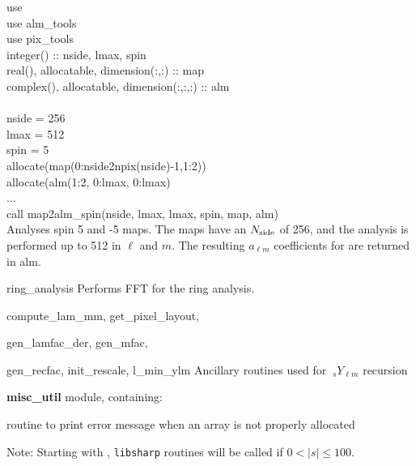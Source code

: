 \begin{example}
{
use \\
use alm\_tools\\
use pix\_tools\\
integer() :: nside, lmax, spin \\
real(), allocatable, dimension(:,:) :: map \\
complex(), allocatable, dimension(:,:,:) :: alm \\
\\
nside = 256 \\
lmax = 512 \\
spin = 5 \\
allocate(map(0:nside2npix(nside)-1,1:2)) \\
allocate(alm(1:2, 0:lmax, 0:lmax)\\
...\\
call map2alm\_spin(nside, lmax, lmax, spin, map, alm)  \\
}
{
Analyses spin 5 and -5 maps. The maps have
an $N_{\mathrm{side}}$ of 256, and the analysis is performed up
to 512 in $\ell$ and $m$. The resulting $a_{\ell m}$ coefficients for
are returned in alm.
}
\end{example}

\begin{modules}
  \begin{sulist}{} %
  \item[ring\_analysis] Performs FFT for the ring analysis.
  \item[compute\_lam\_mm, get\_pixel\_layout, ]
  \item[gen\_lamfac\_der, gen\_mfac,  ] 
  \item[gen\_recfac, init\_rescale, l\_min\_ylm] Ancillary routines used
  for $\ {_s}Y_{\ell m}$ recursion
  \item[\textbf{misc\_util}] module, containing:
  \item[\htmlref{assert\_alloc}{sub:assert}] routine to print error message when an array is not
  properly allocated		
  \end{sulist}
Note: Starting with , {\tt libsharp} routines will be called if $0<|s|\le100$.
\end{modules}

